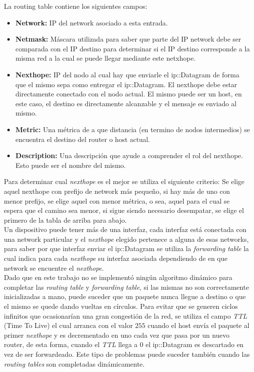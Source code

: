 \documentclass[10pt,a4paper]{article}
\begin{document}
La routing table contiene los siguientes campos:
\begin{itemize}
\item \textbf{Network:} IP del network asociado a esta entrada.
\item \textbf{Netmask:} Máscara utilizada para saber que parte del IP network debe ser comparada con el IP destino para determinar si el IP destino corresponde a la misma red a la cual se puede llegar mediante este netxhope.
\item \textbf{Nexthope:} IP del nodo al cual hay que enviarle el ip::Datagram de forma que el mismo sepa como entregar el ip::Datagram. El nexthope debe estar directamente conectado con el nodo actual. El mismo puede ser un host, en este caso, el destino es directamente alcanzable y el mensaje es enviado al mismo.
\item \textbf{Metric:} Una métrica de a que distancia (en termino de nodos intermedios) se encuentra el destino del router o host actual.
\item \textbf{Description:} Una descripción que ayude a comprender el rol del nexthope. Esto puede ser el nombre del mismo.
\end{itemize}

Para determinar cual \textit{nexthope} es el mejor se utiliza el siguiente criterio: Se elige aquel nexthope con prefijo de network más pequeño, si hay más de uno con menor prefijo, se elige aquel con menor métrica, o sea, aquel para el cual se espera que el camino sea menor, si sigue siendo necesario desempatar, se elige el primero de la tabla de arriba para abajo. \\

Un dispositivo puede tener más de una interfaz, cada interfaz está conectada con una network particular y el \textit{nexthope} elegido pertenece a alguna de esas networks, para saber por que interfaz enviar el ip::Datagram se utiliza la \textit{forwarding table} la cual indica para cada \textit{nexthope} su interfaz asociada dependiendo de en que network se encuentre el \textit{nexthope}. \\

Dado que en este trabajo no se implementó ningún algoritmo dinámico para completar las \textit{routing table} y \textit{forwarding table}, si las mismas no son correctamente inicializadas a mano, puede suceder que un paquete nunca llegue a destino o que el mismo se quede dando vueltas en círculos. Para evitar que se generen ciclos infinitos que ocasionarían una gran congestión de la red, se utiliza el campo \textit{TTL} (Time To Live) el cual arranca con el valor $255$ cuando el host envía el paquete al primer \textit{nexthope} y es decrementado en uno cada vez que pasa por un nuevo router, de esta forma, cuando el \textit{TTL} llega a $0$ el ip::Datagram es descartado en vez de ser forwardeado. Este tipo de problemas puede suceder también cuando las \textit{routing tables} son completadas dinámicamente. \\
\end{document}

